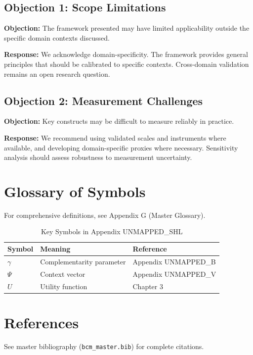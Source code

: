 \subsection{Objection 1: Scope Limitations}

\textbf{Objection:} The framework presented may have limited applicability
outside the specific domain contexts discussed.

\textbf{Response:} We acknowledge domain-specificity. The framework provides
general principles that should be calibrated to specific contexts. Cross-domain
validation remains an open research question.

\subsection{Objection 2: Measurement Challenges}

\textbf{Objection:} Key constructs may be difficult to measure reliably in
practice.

\textbf{Response:} We recommend using validated scales and instruments where
available, and developing domain-specific proxies where necessary. Sensitivity
analysis should assess robustness to measurement uncertainty.



\section{Glossary of Symbols}
\label{sec:shl-glossary}

For comprehensive definitions, see Appendix G (Master Glossary).

\begin{table}[htbp]
\centering
\caption{Key Symbols in Appendix UNMAPPED_SHL}
\begin{tabular}{lll}
\toprule
\textbf{Symbol} & \textbf{Meaning} & \textbf{Reference} \\
\midrule
$\gamma$ & Complementarity parameter & Appendix UNMAPPED_B \\
$\Psi$ & Context vector & Appendix UNMAPPED_V \\
$U$ & Utility function & Chapter 3 \\
\bottomrule
\end{tabular}
\end{table}


\section{References}
\label{sec:shl-references}

See master bibliography (\texttt{bcm\_master.bib}) for complete citations.

\nocite{bcm_master}

